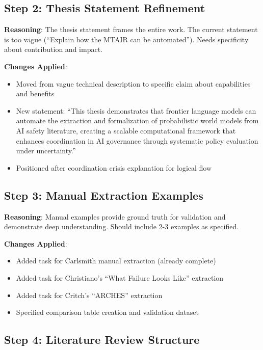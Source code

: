 \documentclass[
  11pt,
  letterpaper,
]{book}
\providecommand{\tightlist}{%
  \setlength{\itemsep}{0pt}\setlength{\parskip}{0pt}}
\begin{document}
\subsection{Step 2: Thesis Statement
Refinement}\label{step-2-thesis-statement-refinement}

\textbf{Reasoning}: The thesis statement frames the entire work. The
current statement is too vague (``Explain how the MTAIR can be
automated''). Needs specificity about contribution and impact.

\textbf{Changes Applied}:

\begin{itemize}
\tightlist
\item
  Moved from vague technical description to specific claim about
  capabilities and benefits
\item
  New statement: ``This thesis demonstrates that frontier language
  models can automate the extraction and formalization of probabilistic
  world models from AI safety literature, creating a scalable
  computational framework that enhances coordination in AI governance
  through systematic policy evaluation under uncertainty.''
\item
  Positioned after coordination crisis explanation for logical flow
\end{itemize}

\subsection{Step 3: Manual Extraction
Examples}\label{step-3-manual-extraction-examples}

\textbf{Reasoning}: Manual examples provide ground truth for validation
and demonstrate deep understanding. Should include 2-3 examples as
specified.

\textbf{Changes Applied}:

\begin{itemize}
\tightlist
\item
  Added task for Carlsmith manual extraction (already complete)
\item
  Added task for Christiano's ``What Failure Looks Like'' extraction
\item
  Added task for Critch's ``ARCHES'' extraction
\item
  Specified comparison table creation and validation dataset
\end{itemize}

\subsection{Step 4: Literature Review
Structure}\label{step-4-literature-review-structure}
\end{document}
